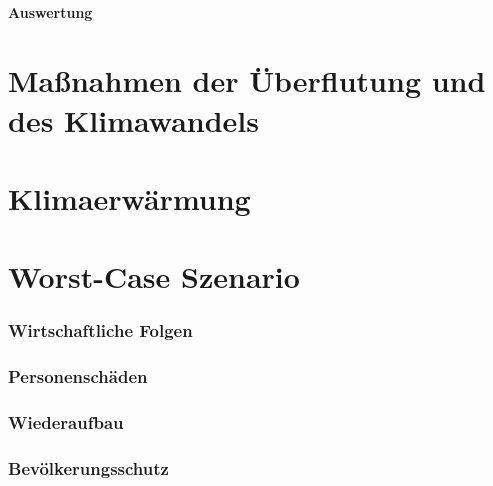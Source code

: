 \subsection{Auswertung}
 
\newpage
\part{Maßnahmen der Überflutung und des Klimawandels}


 


   

\newpage
\part{Klimaerwärmung}



\newpage

\part{Worst-Case Szenario}
\section{Wirtschaftliche Folgen}
\newpage
\section{Personenschäden}
\newpage
\section{Wiederaufbau}
\newpage
\section{Bevölkerungsschutz}


 